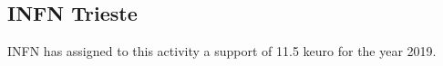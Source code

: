 \subsection{INFN Trieste}
INFN has assigned to this activity a support of 11.5 keuro 
for the year 2019.